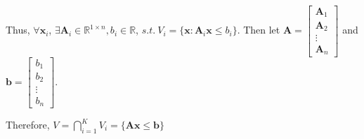 \documentclass{article}
\def\RR{\mathbb{R}}
\def\bb{\boldsymbol{b}}
\def\bx{\boldsymbol{x}}
\def\bA{\boldsymbol{A}}
\begin{document}
Thus, $\forall \bx_i$, $\exists \bA_i\in\RR^{1\times n},b_i\in\RR$, $s.t.\ V_i=\{\bx:\bA_i\bx\le b_i\}$.
Then let 
$\bA=
\begin{bmatrix}
\bA_1\\
\bA_2\\
\vdots\\
\bA_n
\end{bmatrix}$
and 
$\bb=
\begin{bmatrix}
b_1\\
b_2\\
\vdots\\
b_n
\end{bmatrix}$.

Therefore, $V=\bigcap_{i=1}^KV_i=\{\bA\bx\le\bb\}$
\end{document}
